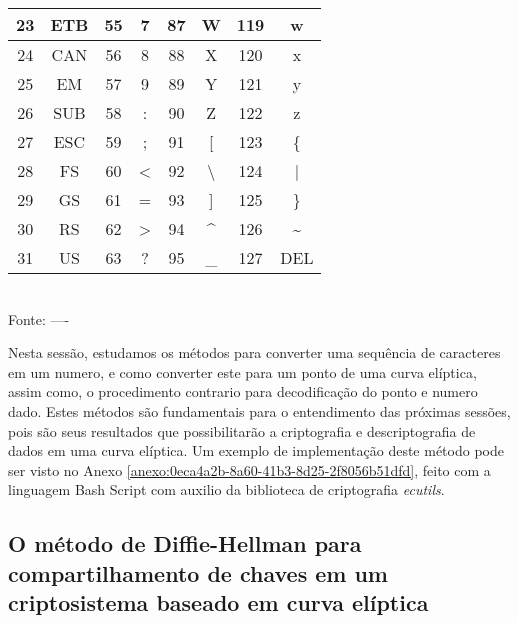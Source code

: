 \begin{table}[h!]
\begin{tabular}{|c|c|c|c|c|c|c|c|}
		23           & ETB           & 55           & 7             & 87           & W              & 119          & w               \\  \hline
		24           & CAN           & 56           & 8             & 88           & X              & 120          & x               \\  \hline
		25           & EM            & 57           & 9             & 89           & Y              & 121          & y               \\  \hline
		26           & SUB           & 58           & :             & 90           & Z              & 122          & z               \\  \hline
		27           & ESC           & 59           & ;             & 91           & [              & 123          & \{              \\  \hline
		28           & FS            & 60           & <             & 92           & \textbackslash & 124          & |               \\  \hline
		29           & GS            & 61           & =             & 93           & ]              & 125          & \}              \\  \hline
		30           & RS            & 62           & >             & 94           & \^{}           & 126          & \textasciitilde \\  \hline
		31           & US            & 63           & ?             & 95           & \_             & 127          & DEL             \\  \hline

	\end{tabular}
	\vspace*{0.4cm}\\ %
	Fonte:  ----
\end{table}

Nesta sessão, estudamos os métodos para converter uma sequência de caracteres
em um numero, e como converter este para um ponto de uma curva elíptica, assim
como, o procedimento contrario para decodificação do ponto e numero dado. Estes
métodos são fundamentais para o entendimento das próximas sessões, pois são
seus resultados que possibilitarão a criptografia e descriptografia de dados em
uma curva elíptica. Um exemplo de implementação deste método pode ser visto no
Anexo \ref{anexo:0eca4a2b-8a60-41b3-8d25-2f8056b51dfd}, feito com a linguagem
Bash Script com auxilio da biblioteca de criptografia \textit{ecutils}.

\subsection{O método de Diffie-Hellman para compartilhamento de chaves em um criptosistema baseado em curva elíptica}

